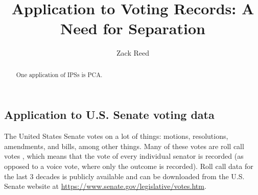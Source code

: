 \documentclass{ximera}
\author{Zack Reed}
\title{Application to Voting Records: A Need for Separation}
\begin{document}
\begin{abstract}

    One application of IPSs is PCA.

\end{abstract}
\maketitle


\subsection*{Application to U.S. Senate voting data}

The United States Senate%
%
%
 votes on a lot of things: motions,
resolutions, amendments, and bills, among other things. Many of these
votes are roll call votes%
%
, which means that the vote of every individual
senator is recorded (as opposed to a voice vote, where only the
outcome is recorded). Roll call data for the last 3 decades is
publicly available and can be downloaded from the U.S. Senate website
at \url{https://www.senate.gov/legislative/votes.htm}.
\end{document}
